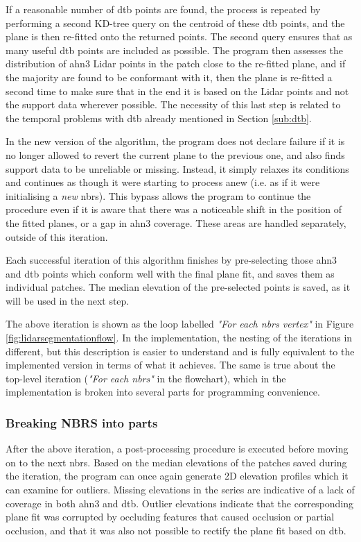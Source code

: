 If a reasonable number of \ac{dtb} points are found, the process is repeated by performing a second KD-tree query on the centroid of these \ac{dtb} points, and the plane is then re-fitted onto the returned points. The second query ensures that as many useful \ac{dtb} points are included as possible. The program then assesses the distribution of \ac{ahn3} Lidar points in the patch close to the re-fitted plane, and if the majority are found to be conformant with it, then the plane is re-fitted a second time to make sure that in the end it is based on the Lidar points and not the support data wherever possible. The necessity of this last step is related to the temporal problems with \ac{dtb} already mentioned in Section \ref{sub:dtb}.

In the new version of the algorithm, the program does not declare failure if it is no longer allowed to revert the current plane to the previous one, and also finds support data to be unreliable or missing. Instead, it simply relaxes its conditions and continues as though it were starting to process anew (i.e. as if it were initialising a \textit{new} \ac{nbrs}). This bypass allows the program to continue the procedure even if it is aware that there was a noticeable shift in the position of the fitted planes, or a gap in \ac{ahn3} coverage. These areas are handled separately, outside of this iteration.

Each successful iteration of this algorithm finishes by pre-selecting those \ac{ahn3} and \ac{dtb} points which conform well with the final plane fit, and saves them as individual patches. The median elevation of the pre-selected points is saved, as it will be used in the next step.

The above iteration is shown as the loop labelled \textit{"For each \ac{nbrs} vertex"} in Figure \ref{fig:lidarsegmentationflow}. In the implementation, the nesting of the iterations in different, but this description is easier to understand and is fully equivalent to the implemented version in terms of what it achieves. The same is true about the top-level iteration (\textit{"For each \ac{nbrs}"} in the flowchart), which in the implementation is broken into several parts for programming convenience.

\subsubsection{Breaking NBRS into parts}

After the above iteration, a post-processing procedure is executed before moving on to the next \ac{nbrs}. Based on the median elevations of the patches saved during the iteration, the program can once again generate 2D elevation profiles which it can examine for outliers. Missing elevations in the series are indicative of a lack of coverage in both \ac{ahn3} and \ac{dtb}. Outlier elevations indicate that the corresponding plane fit was corrupted by occluding features that caused occlusion or partial occlusion, and that it was also not possible to rectify the plane fit based on \ac{dtb}.

